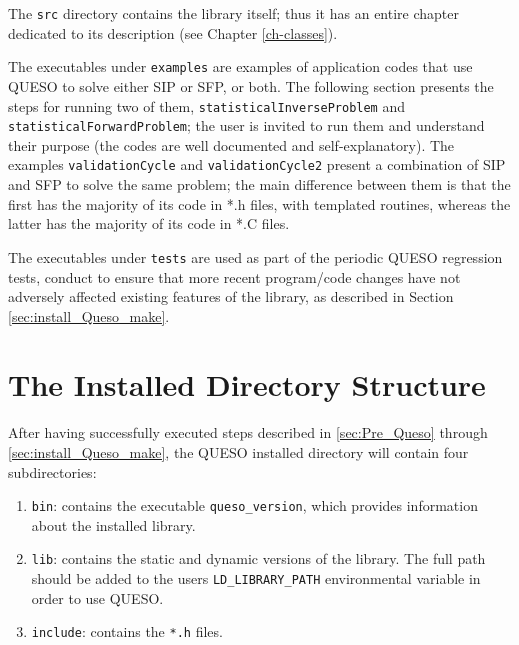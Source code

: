 The \verb+src+ directory contains the library itself; thus it has an entire chapter dedicated to its description (see Chapter \ref{ch-classes}).

The executables under \verb+examples+ are examples of application codes that use QUESO to solve either SIP or SFP, or both. The following section presents the steps for running two of them, \verb+statisticalInverseProblem+ and \verb+statisticalForwardProblem+; the user is invited to run them and understand their purpose (the codes are well documented and self-explanatory). The examples \verb+validationCycle+ and \verb+validationCycle2+ present a combination of SIP and SFP to solve the same problem; the main difference between them is that the first has the majority of its code in *.h files, with templated routines, whereas the latter has the majority of its code in *.C files.


The executables under \verb+tests+ are used as part of the periodic QUESO regression tests, conduct to ensure that more recent program/code
changes have not adversely affected existing features of the library, as described in Section \ref{sec:install_Queso_make}.


% 


\section{The Installed Directory Structure} \label{sc-installed-dir-structure}

After having successfully executed steps described in \textsection{}\ref{sec:Pre_Queso} through \textsection{}\ref{sec:install_Queso_make}, the QUESO installed directory will contain four subdirectories:
\begin{enumerate}
 \item \verb+bin+: contains the executable \verb+queso_version+, which provides information about the installed library.
 \item \verb+lib+: contains the static and dynamic versions of the library. The full path should be added to the users \verb+LD_LIBRARY_PATH+ environmental variable in order to use QUESO.
 \item \verb+include+: contains the \verb+*.h+ files.
\end{enumerate}



